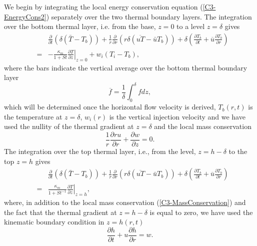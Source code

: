 We  begin  by  integrating  the  local  energy  conservation  equation
(\ref{C3-EnergyCons2})  separately  over   the  two  thermal  boundary
layers.  The integration over the  bottom thermal layer, i.e. from the
base, $z=0$ to a level $z = \delta$ gives
\begin{eqnarray}
  &&\frac{\partial}{\partial t}\left( \delta( \bar{T}-T_b)\right)+\frac{1}{r}\frac{\partial}{\partial r} \left( r\delta(\overline{uT}-\bar{u}T_b)\right) + \delta\left( \frac{\partial T_b}{\partial t}+ \overline{u}\frac{\partial T_b}{\partial r}\right)\nonumber\\
  &=&-\frac{\kappa_m}{1+St}\left. \frac{\partial T}{\partial z}\right|_{z=0}+w_{i}(T_{i}-T_b),
      \label{C3-Local1}
\end{eqnarray}
where the bars  indicate the vertical average over  the bottom thermal
boundary layer
\begin{equation}
  \overline{f} = \frac{1}{\delta}\int_0^{\delta}f dz\nonumber,
\end{equation}
which will be determined once the horizontal flow velocity is derived,
$T_b(r,t)$  is  the  temperature  at  $z=\delta$,  $w_{i}(r)$  is  the
vertical  injection velocity  and  we  have used  the  nullity of  the
thermal gradient at $z=\delta$ and the local mass conservation
\begin{equation}
  \frac{1}{r}\frac{\partial ru}{\partial r} +\frac{\partial w}{\partial z}=0.
  \label{C3-MassConservation}
\end{equation}
The  integration over  the top  thermal layer,  i.e., from  the level,
$z=h-\delta$ to the top $z=h$ gives
\begin{eqnarray}
  &&\frac{\partial}{\partial t}\left( \delta( \bar{T}-T_b)\right)+\frac{1}{r}\frac{\partial}{\partial r} \left( r\delta(\overline{uT}-\bar{u}T_b)\right) + \delta\left(\frac{\partial T_b}{\partial t}+ \overline{u}\frac{\partial T_b}{\partial r}\right)\nonumber\\
  &=&\frac{\kappa_m}{1+St^{-1}}\left. \frac{\partial T}{\partial z}\right|_{z=h},
      \label{C3-Local2}
\end{eqnarray}
where,    in    addition    to    the    local    mass    conservation
(\ref{C3-MassConservation}) and the fact  that the thermal gradient at
$z=h-\delta$ is  equal to  zero, we have  used the  kinematic boundary
condition in $z=h(r,t)$
\begin{equation}
  \frac{\partial h}{\partial t} +u\frac{\partial h}{\partial
    r} = w.
\end{equation}

